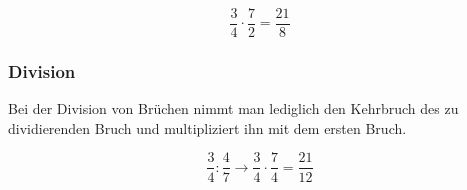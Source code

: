 \begin{beispiel}
	\[\frac{3}{4}\cdot\frac{7}{2}=\frac{21}{8}\]
\end{beispiel}

\subsubsection{Division} Bei der Division von Brüchen nimmt man lediglich den Kehrbruch des zu dividierenden Bruch und multipliziert ihn mit dem ersten Bruch. 

\begin{beispiel}
	\[\frac{3}{4}:\frac{4}{7} \rightarrow \frac{3}{4}\cdot \frac{7}{4}= \frac{21}{12}\]
\end{beispiel}